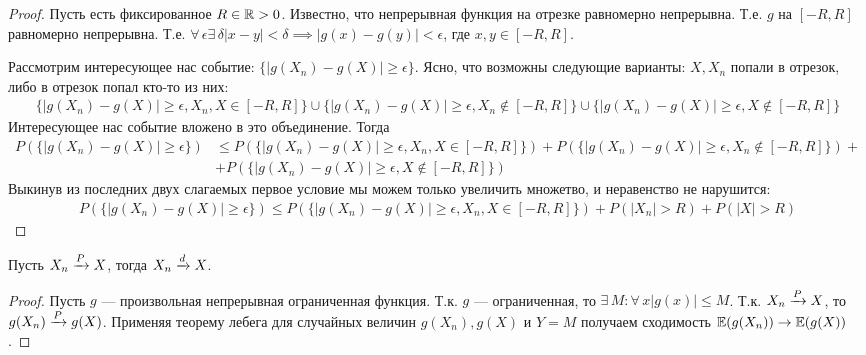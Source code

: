 \begin{proof}
    Пусть есть фиксированное $R \in \mathbb{R} > 0$. Известно, что непрерывная функция на отрезке равномерно непрерывна.
    Т.е. $g$ на $[-R, R]$ равномерно непрерывна. Т.е. $\forall\, \epsilon \exists\, \delta |x - y| < \delta \implies
    |g(x) - g(y)| < \epsilon$, где $x, y \in [-R, R]$.

    Рассмотрим интересующее нас событие: $\{|g(X_n) - g(X)| \geq \epsilon\}$. Ясно, что возможны следующие варианты:
    $X, X_n$ попали в отрезок, либо в отрезок попал кто-то из них:
    \begin{align*}
        \{|g(X_n) - g(X)| \geq \epsilon, X_n, X \in [-R, R]\} \cup
        \{|g(X_n) - g(X)| \geq \epsilon, X_n \notin [-R, R]\} \cup
        \{|g(X_n) - g(X)| \geq \epsilon, X \notin [-R, R]\}
    \end{align*}
    Интересующее нас событие вложено в это объединение. Тогда
    \begin{align*}
        P(\{|g(X_n) - g(X)| \geq \epsilon\}) &\leq P(\{|g(X_n) - g(X)| \geq \epsilon, X_n, X \in [-R, R]\}) +
        P(\{|g(X_n) - g(X)| \geq \epsilon, X_n \notin [-R, R]\}) +\\
        &+ P(\{|g(X_n) - g(X)| \geq \epsilon, X \notin [-R, R]\})
    \end{align*}
    Выкинув из последних двух слагаемых первое условие мы можем только увеличить множетво, и неравенство не нарушится:
    \begin{align*}
        P(\{|g(X_n) - g(X)| \geq \epsilon\}) \leq P(\{|g(X_n) - g(X)| \geq \epsilon, X_n, X \in [-R, R]\}) +
        P(|X_n| > R) +
        P(|X| > R)
    \end{align*}
\end{proof}
\begin{corollary}
    Пусть $X_n \xrightarrow{P} X$, тогда $X_n \xrightarrow{d} X$.
\end{corollary}
\begin{proof}
    Пусть $g$ --- произвольная непрерывная ограниченная функция. Т.к. $g$ --- ограниченная, то $\exists\, M \colon
    \forall\, x |g(x)| \leq M$. Т.к. $X_n \xrightarrow{P} X$, то $g(X_n) \xrightarrow{P} g(X)$. Применяя теорему лебега для случайных величин
    $g(X_n), g(X)$ и $Y = M$ получаем сходимость $\mathbb{E}(g(X_n)) \to \mathbb{E}(g(X))$.
\end{proof}

